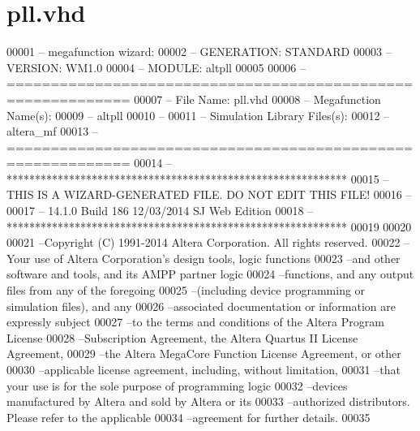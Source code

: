 \hypertarget{pll_8vhd_source}{}\section{pll.\+vhd}

\begin{DoxyCode}
00001 \textcolor{keyword}{-- megafunction wizard: %
00002 \textcolor{keyword}{-- GENERATION: STANDARD}
00003 \textcolor{keyword}{-- VERSION: WM1.0}
00004 \textcolor{keyword}{-- MODULE: altpll }
00005 
00006 \textcolor{keyword}{-- ============================================================}
00007 \textcolor{keyword}{-- File Name: pll.vhd}
00008 \textcolor{keyword}{-- Megafunction Name(s):}
00009 \textcolor{keyword}{--          altpll}
00010 \textcolor{keyword}{--}
00011 \textcolor{keyword}{-- Simulation Library Files(s):}
00012 \textcolor{keyword}{--          altera\_mf}
00013 \textcolor{keyword}{-- ============================================================}
00014 \textcolor{keyword}{-- ************************************************************}
00015 \textcolor{keyword}{-- THIS IS A WIZARD-GENERATED FILE. DO NOT EDIT THIS FILE!}
00016 \textcolor{keyword}{--}
00017 \textcolor{keyword}{-- 14.1.0 Build 186 12/03/2014 SJ Web Edition}
00018 \textcolor{keyword}{-- ************************************************************}
00019 
00020 
00021 \textcolor{keyword}{--Copyright (C) 1991-2014 Altera Corporation. All rights reserved.}
00022 \textcolor{keyword}{--Your use of Altera Corporation's design tools, logic functions }
00023 \textcolor{keyword}{--and other software and tools, and its AMPP partner logic }
00024 \textcolor{keyword}{--functions, and any output files from any of the foregoing }
00025 \textcolor{keyword}{--(including device programming or simulation files), and any }
00026 \textcolor{keyword}{--associated documentation or information are expressly subject }
00027 \textcolor{keyword}{--to the terms and conditions of the Altera Program License }
00028 \textcolor{keyword}{--Subscription Agreement, the Altera Quartus II License Agreement,}
00029 \textcolor{keyword}{--the Altera MegaCore Function License Agreement, or other }
00030 \textcolor{keyword}{--applicable license agreement, including, without limitation, }
00031 \textcolor{keyword}{--that your use is for the sole purpose of programming logic }
00032 \textcolor{keyword}{--devices manufactured by Altera and sold by Altera or its }
00033 \textcolor{keyword}{--authorized distributors.  Please refer to the applicable }
00034 \textcolor{keyword}{--agreement for further details.}
00035 
}
\end{DoxyCode}
